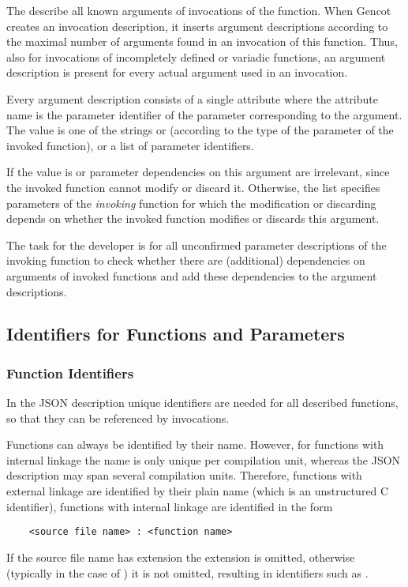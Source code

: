 The  describe all known arguments of invocations of the function. When Gencot creates an
invocation description, it inserts argument descriptions according to the maximal number of arguments found in an 
invocation of this function. Thus, also for invocations of incompletely defined or variadic functions, an argument
description is present for every actual argument used in an invocation.

Every argument description consists of a single attribute where the attribute name is the parameter identifier of the 
parameter corresponding to the argument. The value is one of the strings  or 
(according to the type of the parameter of the invoked function), or a list of parameter identifiers.

If the value is  or  parameter dependencies on this argument are irrelevant, since
the invoked function cannot modify or discard it. Otherwise, the list specifies parameters of the \textit{invoking}
function for which the modification or discarding depends on whether the invoked function modifies or discards this
argument.

The task for the developer is for all unconfirmed parameter descriptions of the invoking function to check whether
there are (additional) dependencies on arguments of invoked functions and add these dependencies to the argument 
descriptions.

\subsection{Identifiers for Functions and Parameters}
\label{impl-parmod-ids}

\subsubsection{Function Identifiers}

In the JSON description unique identifiers are needed for all described functions, so that they can be referenced by
invocations.

Functions can always be identified by their name. However, for functions with internal linkage the name is only unique
per compilation unit, whereas the JSON description may span several compilation units. Therefore, functions with 
external linkage are identified by their plain name (which is an unstructured C identifier), functions with
internal linkage are identified in the form
\begin{verbatim}
    <source file name> : <function name>
\end{verbatim}
If the source file name has extension  the extension is omitted, otherwise (typically in the case of )
it is not omitted, resulting in identifiers such as .

